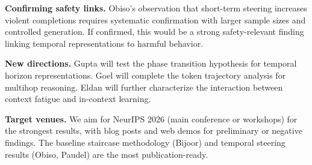 \documentclass[midterm]{sparreport}
\begin{document}
\textbf{Confirming safety links.} Obiso's observation that short-term steering increases violent completions requires systematic confirmation with larger sample sizes and controlled generation. If confirmed, this would be a strong safety-relevant finding linking temporal representations to harmful behavior.

\textbf{New directions.} Gupta will test the phase transition hypothesis for temporal horizon representations. Goel will complete the token trajectory analysis for multihop reasoning. Eldan will further characterize the interaction between context fatigue and in-context learning.

\textbf{Target venues.} We aim for NeurIPS 2026 (main conference or workshops) for the strongest results, with blog posts and web demos for preliminary or negative findings. The baseline staircase methodology (Bijoor) and temporal steering results (Obiso, Paudel) are the most publication-ready.



\end{document}
